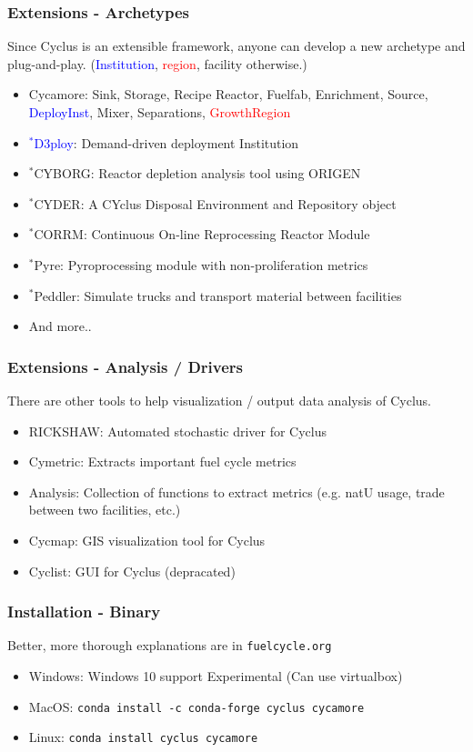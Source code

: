 \begin{frame}
	\frametitle{Extensions - Archetypes}
	Since Cyclus is an extensible framework, anyone can develop a new archetype and plug-and-play. (\textcolor{blue}{Institution}, \textcolor{red}{region}, facility otherwise.)
	\begin{itemize}
		\item Cycamore: Sink, Storage, Recipe Reactor, Fuelfab, Enrichment, Source, \textcolor{blue}{DeployInst}, Mixer, Separations, \textcolor{red}{GrowthRegion} \cite{huff_fundamental_2016}
		\item \textcolor{blue}{$^*$D3ploy}: Demand-driven deployment Institution \cite{noauthor_d3ploy:_2018} 
		\item $^*$CYBORG: Reactor depletion analysis tool using ORIGEN \cite{skutnik_cyborg:_2016}
		\item $^*$CYDER: A CYclus Disposal Environment and Repository object \cite{huff_cyclus_2013}
		\item $^*$CORRM: Continuous On-line Reprocessing Reactor Module \cite{recycle_recycle:_2018}
		\item $^*$Pyre: Pyroprocessing module with non-proliferation metrics \cite{}
        \item $^*$Peddler: Simulate trucks and transport material between facilities \cite{noauthor_peddler:_2018}
		\item And more..
	\end{itemize}
\end{frame}

\begin{frame}
	\frametitle{Extensions - Analysis / Drivers}
	There are other tools to help visualization / output data analysis of Cyclus.
	\begin{itemize}
		\item RICKSHAW: Automated stochastic driver for Cyclus
		\item Cymetric: Extracts important fuel cycle metrics
		\item Analysis: Collection of functions to extract metrics (e.g. natU usage, trade between two facilities, etc.) 
		\item Cycmap: GIS visualization tool for Cyclus
		\item Cyclist: GUI for Cyclus (depracated)
	\end{itemize}
\end{frame}


\begin{frame}
	\frametitle{Installation - Binary}
	Better, more thorough explanations are in \texttt{fuelcycle.org}
	\begin{itemize}
		\item Windows: Windows 10 support Experimental (Can use virtualbox) 
		\item MacOS: \texttt{conda install -c conda-forge cyclus cycamore}
		\item Linux: \texttt{conda install cyclus cycamore}
	\end{itemize}
\end{frame}


